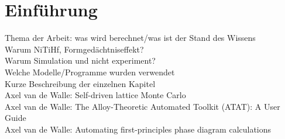\chapter{Einführung}
Thema der Arbeit: was wird berechnet/was ist der Stand des Wissens \\
Warum NiTiHf, Formgedächtniseffekt? \\
Warum Simulation und nicht experiment? \\
Welche Modelle/Programme wurden verwendet \\
Kurze Beschreibung der einzelnen Kapitel \\
Axel van de Walle: Self-driven lattice Monte Carlo \cite{Walle2002d}\\
Axel van de Walle: The Alloy-Theoretic Automated Toolkit (ATAT): A User Guide \cite{Walle2002a} \\
Axel van de Walle: Automating first-principles phase diagram calculations \cite{Walle2002c} \\